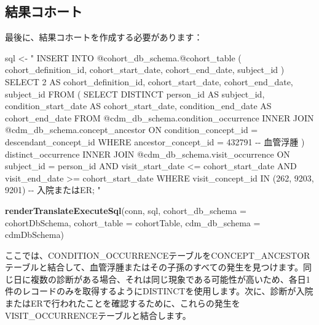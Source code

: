 \documentclass[
  11pt]{book}
\newenvironment{Shaded}{\begin{snugshade}}{\end{snugshade}}
\newcommand{\AttributeTok}[1]{\textcolor[rgb]{0.13,0.29,0.53}{#1}}
\newcommand{\FunctionTok}[1]{\textcolor[rgb]{0.13,0.29,0.53}{\textbf{#1}}}
\newcommand{\NormalTok}[1]{#1}
\newcommand{\OtherTok}[1]{\textcolor[rgb]{0.56,0.35,0.01}{#1}}
\newcommand{\StringTok}[1]{\textcolor[rgb]{0.31,0.60,0.02}{#1}}
\theoremstyle{definition}
\theoremstyle{definition}
\theoremstyle{definition}
\theoremstyle{definition}
\theoremstyle{remark}
\begin{document}
\subsection{結果コホート}\label{ux7d50ux679cux30b3ux30dbux30fcux30c8}

最後に、結果コホートを作成する必要があります：

\begin{Shaded}
\begin{Highlighting}[]
\NormalTok{sql }\OtherTok{\textless{}{-}} \StringTok{"}
\StringTok{INSERT INTO @cohort\_db\_schema.@cohort\_table (}
\StringTok{ cohort\_definition\_id,}
\StringTok{ cohort\_start\_date,}
\StringTok{ cohort\_end\_date,}
\StringTok{subject\_id}
\StringTok{)}
\StringTok{SELECT 2 AS cohort\_definition\_id,}
\StringTok{  cohort\_start\_date,}
\StringTok{  cohort\_end\_date,}
\StringTok{  subject\_id}
\StringTok{FROM (}
\StringTok{  SELECT DISTINCT person\_id AS subject\_id,}
\StringTok{    condition\_start\_date AS cohort\_start\_date,}
\StringTok{    condition\_end\_date AS cohort\_end\_date}
\StringTok{  FROM @cdm\_db\_schema.condition\_occurrence}
\StringTok{  INNER JOIN @cdm\_db\_schema.concept\_ancestor}
\StringTok{    ON condition\_concept\_id = descendant\_concept\_id}
\StringTok{  WHERE ancestor\_concept\_id = 432791 {-}{-} 血管浮腫}
\StringTok{) distinct\_occurrence}
\StringTok{INNER JOIN @cdm\_db\_schema.visit\_occurrence}
\StringTok{  ON subject\_id = person\_id}
\StringTok{  AND visit\_start\_date \textless{}= cohort\_start\_date}
\StringTok{  AND visit\_end\_date \textgreater{}= cohort\_start\_date}
\StringTok{WHERE visit\_concept\_id IN (262, 9203,}
\StringTok{    9201) {-}{-} 入院またはER;}
\StringTok{"}

\FunctionTok{renderTranslateExecuteSql}\NormalTok{(conn, sql,}
                          \AttributeTok{cohort\_db\_schema =}\NormalTok{ cohortDbSchema,}
                          \AttributeTok{cohort\_table =}\NormalTok{ cohortTable,}
                          \AttributeTok{cdm\_db\_schema =}\NormalTok{ cdmDbSchema)}
\end{Highlighting}
\end{Shaded}

ここでは、CONDITION\_OCCURRENCEテーブルをCONCEPT\_ANCESTORテーブルと結合して、血管浮腫またはその子孫のすべての発生を見つけます。同じ日に複数の診断がある場合、それは同じ現象である可能性が高いため、各日1件のレコードのみを取得するようにDISTINCTを使用します。次に、診断が入院またはERで行われたことを確認するために、これらの発生をVISIT\_OCCURRENCEテーブルと結合します。
\end{document}
